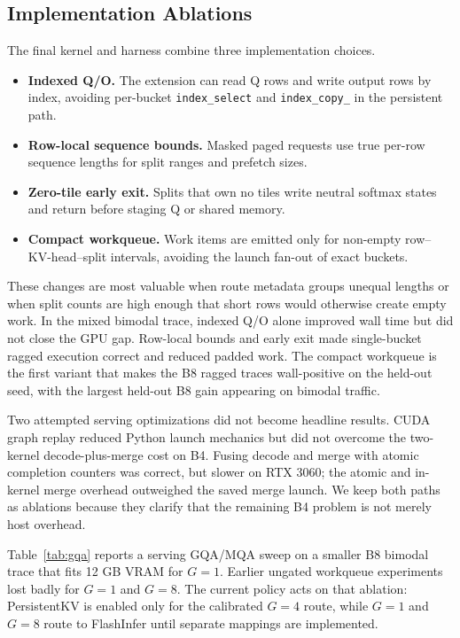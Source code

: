 \documentclass[10pt]{article}
\begin{document}
\subsection{Implementation Ablations}

The final kernel and harness combine three implementation choices.
\begin{itemize}
  \item \textbf{Indexed Q/O.} The extension can read Q rows and write output
  rows by index, avoiding per-bucket \texttt{index\_select} and
  \texttt{index\_copy\_} in the persistent path.
  \item \textbf{Row-local sequence bounds.} Masked paged requests use true
  per-row sequence lengths for split ranges and prefetch sizes.
  \item \textbf{Zero-tile early exit.} Splits that own no tiles write neutral
  softmax states and return before staging Q or shared memory.
  \item \textbf{Compact workqueue.} Work items are emitted only for non-empty
  row--KV-head--split intervals, avoiding the launch fan-out of exact buckets.
\end{itemize}
These changes are most valuable when route metadata groups unequal lengths or
when split counts are high enough that short rows would otherwise create empty
work. In the mixed bimodal trace, indexed Q/O alone improved wall time but did
not close the GPU gap. Row-local bounds and early exit made single-bucket
ragged execution correct and reduced padded work. The compact workqueue is the
first variant that makes the B8 ragged traces wall-positive on the held-out
seed, with the largest held-out B8 gain appearing on bimodal traffic.

Two attempted serving optimizations did not become headline results. CUDA graph
replay reduced Python launch mechanics but did not overcome the two-kernel
decode-plus-merge cost on B4. Fusing decode and merge with atomic completion
counters was correct, but slower on RTX 3060; the atomic and in-kernel merge
overhead outweighed the saved merge launch. We keep both paths as ablations
because they clarify that the remaining B4 problem is not merely host overhead.

Table~\ref{tab:gqa} reports a serving GQA/MQA sweep on a smaller B8 bimodal
trace that fits 12 GB VRAM for $G=1$. Earlier ungated workqueue experiments
lost badly for $G=1$ and $G=8$. The current policy acts on that ablation:
PersistentKV is enabled only for the calibrated $G=4$ route, while $G=1$ and
$G=8$ route to FlashInfer until separate mappings are implemented.
\end{document}
